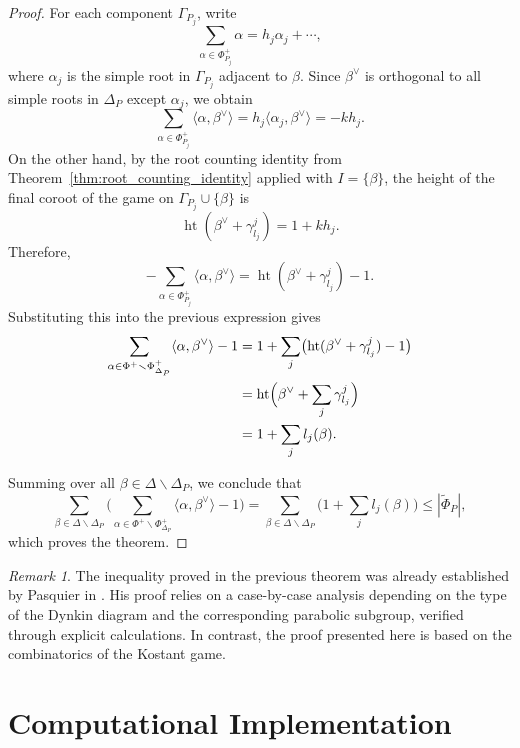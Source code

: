 \documentclass[11pt,a4paper]{amsart}
\theoremstyle{plain}
\theoremstyle{definition}
\theoremstyle{remark}
\newtheorem{remark}[theorem]{Remark}
\begin{document}
\begin{proof}
For each component $\Gamma_{P_j}$, write
\[
\sum_{\alpha\in \Phi_{P_j}^+}\alpha
=
h_j\alpha_j+\cdots,
\]
where $\alpha_j$ is the simple root in $\Gamma_{P_j}$ adjacent to $\beta$.
Since $\beta^\vee$ is orthogonal to all simple roots in $\Delta_P$ except $\alpha_j$, we obtain
\[
\sum_{\alpha\in \Phi_{P_j}^+}\langle \alpha,\beta^\vee\rangle
=
h_j\langle \alpha_j,\beta^\vee\rangle
=
-kh_j.
\]
On the other hand, by the root counting identity from Theorem~\ref{thm:root_counting_identity} applied with $I=\{\beta\}$, the height of the final coroot of the game on $\Gamma_{P_j}\cup\{\beta\}$ is
\[
\operatorname{ht}(\beta^\vee+\gamma_{l_j}^j)=1+kh_j.
\]
Therefore,
\[
-\sum_{\alpha\in \Phi_{P_j}^+}\langle \alpha,\beta^\vee\rangle
=
\operatorname{ht}(\beta^\vee+\gamma_{l_j}^j)-1.
\]
Substituting this into the previous expression gives
\begin{align*}
\sum_{\alpha\in \Phi^+\smallsetminus \Phi_{\Delta_P}^+}
\langle \alpha,\beta^\vee\rangle-1
&=
1+\sum_j
\bigl(\operatorname{ht}(\beta^\vee+\gamma_{l_j}^j)-1\bigr) \\
&=
\operatorname{ht}\Bigl(\beta^\vee+\sum_j\gamma_{l_j}^j\Bigr) \\
&=
1+\sum_j l_j(\beta).
\end{align*}

Summing over all $\beta\in \Delta \smallsetminus \Delta_P$, we conclude that
\[
\sum_{\beta\in \Delta \smallsetminus \Delta_P}
\Biggl(
\sum_{\alpha\in \Phi^+\smallsetminus \Phi_{\Delta_P}^+}
\langle \alpha,\beta^\vee\rangle-1
\Biggr)
=
\sum_{\beta\in \Delta \smallsetminus \Delta_P}
\bigl(1+\sum_j l_j(\beta)\bigr)
\le |\tilde{\Phi}_{P}|,
\]
which proves the theorem.
\end{proof}

\begin{remark}
The inequality proved in the previous theorem was already established by Pasquier in \cite[Lemma~4.8]{pasquier}. His proof relies on a case-by-case analysis depending on the type of the Dynkin diagram and the corresponding parabolic subgroup, verified through explicit calculations. In contrast, the proof presented here is based on the combinatorics of the Kostant game.
\end{remark}



\section{Computational Implementation}
\label{sec:implementation}
\end{document}
